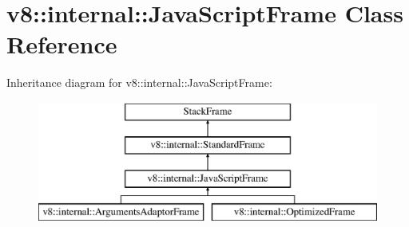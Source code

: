 \hypertarget{classv8_1_1internal_1_1_java_script_frame}{}\section{v8\+:\+:internal\+:\+:Java\+Script\+Frame Class Reference}
\label{classv8_1_1internal_1_1_java_script_frame}
Inheritance diagram for v8\+:\+:internal\+:\+:Java\+Script\+Frame\+:\begin{figure}[H]
\begin{center}
\leavevmode
\includegraphics[height=4.000000cm]{classv8_1_1internal_1_1_java_script_frame}
\end{center}
\end{figure}

